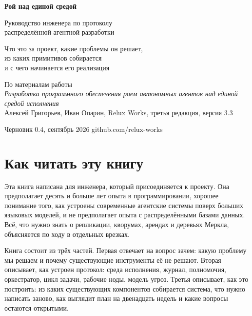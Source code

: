 \begin{titlepage}
\thispagestyle{empty}
\vspace*{30mm}
{\sffamily\bfseries\fontsize{34}{40}\selectfont\color{ink}Рой над единой средой\par}
\vspace{10pt}
{\sffamily\fontsize{16}{20}\selectfont\color{midgray}Руководство инженера по протоколу\\распределённой агентной разработки\par}
\vspace{22mm}
{\normalsize\color{ink}
Что это за проект, какие проблемы он решает,\\
из каких примитивов собирается\\
и с чего начинается его реализация\par}
\vfill
{\normalsize\color{ink}
По материалам работы\\
\textit{Разработка программного обеспечения роем автономных агентов над единой средой исполнения}\\
Алексей Григорьев, Иван Опарин, Relux Works, третья редакция, версия 3.3\par}
\vspace{8mm}
{\sffamily\footnotesize\color{midgray}Черновик 0.4, сентябрь 2026 \quad github.com/relux-works\par}
\end{titlepage}

\chapter*{Как читать эту книгу}

Эта книга написана для инженера, который присоединяется к проекту. Она предполагает десять и больше лет опыта в программировании, хорошее понимание того, как устроены современные агентские системы поверх больших языковых моделей, и не предполагает опыта с распределёнными базами данных. Всё, что нужно знать о репликации, кворумах, арендах и деревьях Меркла, объясняется по ходу в отдельных врезках.

Книга состоит из трёх частей. Первая отвечает на вопрос зачем: какую проблему мы решаем и почему существующие инструменты её не решают. Вторая описывает, как устроен протокол: среда исполнения, журнал, полномочия, оркестратор, цикл задачи, рабочие ноды, модель угроз. Третья описывает, как это построить: из каких существующих компонентов собирается система, что нужно написать заново, как выглядит план на двенадцать недель и какие вопросы остаются открытыми.


